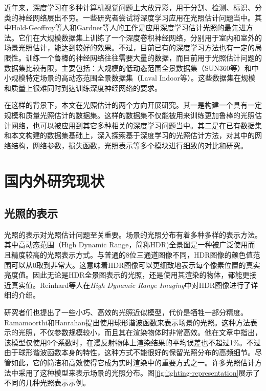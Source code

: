 近年来，深度学习在多种计算机视觉问题上大放异彩，用于分割、检测、标识、分类的神经网络层出不穷。一些研究者尝试将深度学习应用在光照估计问题当中。其中Hold-Geoffroy等人\cite{hold2017deep}和Gardner\cite{gardner2017learning}等人的工作是应用深度学习估计光照的最先进方法。它们在大规模数据集上训练了一个深度卷积神经网络，分别用于室内和室外的场景光照估计，能达到较好的效果。不过，目前已有的深度学习方法也有一定的局限性。训练一个鲁棒的神经网络往往需要大量的数据，而目前用于光照估计问题的数据集比较有限，主要包括：大规模的低动态范围全景数据集（SUN360\cite{xiao2012recognizing}等）和中小规模特定场景的高动态范围全景数据集（Laval Indoor等\cite{gardner2017learning}）。这些数据集在规模和质量上很难同时到达训练深度神经网络的要求。

在这样的背景下，本文在光照估计的两个方向开展研究。其一是构建一个具有一定规模和质量光照估计的数据集。这样的数据集不仅能被用来训练更加鲁棒的光照估计网络，也可以被应用到其它多种相关的深度学习问题当中。其二是在已有数据集和本文构建的数据集基础上，深入探索基于深度学习的光照估计方法，对其中的网络结构，网络参数，损失函数，光照表示等多个模块进行细致的对比和研究。

\section{国内外研究现状}
\subsection{光照的表示}
光照的表示对光照估计问题至关重要。场景的光照分布有着多种多样的表示方法。其中高动态范围（High Dynamic Range，简称HDR)全景图是一种被广泛使用而且精度较高的光照表示方式。与普通的8位三通道图像不同，HDR图像的颜色值范围可以从0取到非常大。这意味着HDR图像可以更细致地表示每个像素位置的真实亮度值。因此无论是HDR全景图表示的光照，还是使用其渲染的物体，都能更接近真实值。Reinhard等人在\textit{High Dynamic Range Imaging}\cite{reinhard2005high}中对HDR图像进行了详细的介绍。

研究者们也提出了一些小巧、高效的光照近似模型，代价是牺牲一部分精度。Ramamoorthi和Hanrahan\cite{ramamoorthi2001efficient}提出使用球形谐波函数来表示场景的光照。这种方法表示的光照，不仅参数规模较小，而且其在渲染物体时非常高效。他在文章中指出，该模型仅使用9个系数时，在漫反射物体上渲染结果的平均误差也不超过1\%。不过由于球形谐波函数本身的特性，这种方式不能很好的保留光照分布的高频细节。尽管如此，它的简洁和高效使得它成为实时渲染中的重要方式之一\cite{green2003spherical,sloan2008stupid}。许多光照估计方法中采用了这种模型来表示场景的光照分布。图\ref{fig:lighting-representation}展示了不同的几种光照表示示例。

